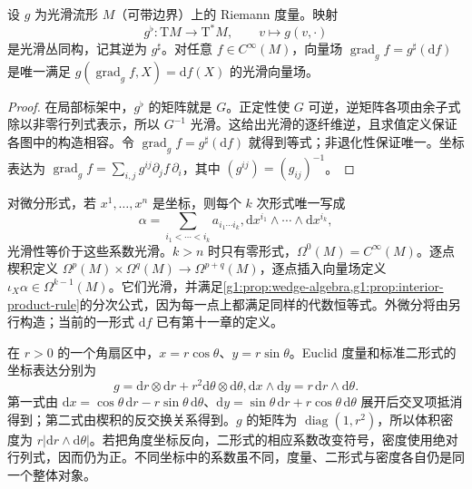 \begin{proposition}
	\label{g1:prop:metric-duality-smooth}
	设 \(g\) 为光滑流形 \(M\)（可带边界）上的 Riemann 度量。映射
	\[
		g^\flat:\mathrm{T}M\longrightarrow \mathrm{T}^*M,\qquad
		v\longmapsto g(v,\cdot)
	\]
	是光滑丛同构，记其逆为 \(g^\sharp\)。对任意 \(f\in C^\infty(M)\)，向量场 \(\operatorname{grad}_g f=g^\sharp(\mathrm{d}f)\) 是唯一满足 \(g(\operatorname{grad}_g f,X)=\mathrm{d}f(X)\) 的光滑向量场。
\end{proposition}

\begin{proof}
	在局部标架中，\(g^\flat\) 的矩阵就是 \(G\)。正定性使 \(G\) 可逆，逆矩阵各项由余子式除以非零行列式表示，所以 \(G^{-1}\) 光滑。这给出光滑的逐纤维逆，且求值定义保证各图中的构造相容。令 \(\operatorname{grad}_g f=g^\sharp(\mathrm{d}f)\) 就得到等式；非退化性保证唯一。坐标表达为 \(\operatorname{grad}_g f=\sum_{i,j}g^{ij}\partial_jf\,\partial_i\)，其中 \((g^{ij})=(g_{ij})^{-1}\)。
\end{proof}

对微分形式，若 \(x^1,\ldots,x^n\) 是坐标，则每个 \(k\) 次形式唯一写成
\[
	\alpha=\sum_{i_1<\cdots<i_k}a_{i_1\cdots i_k},
	\mathrm{d}x^{i_1}\wedge\cdots\wedge\mathrm{d}x^{i_k},
\]
光滑性等价于这些系数光滑。\(k>n\) 时只有零形式，\(\Omega^0(M)=C^\infty(M)\)。逐点楔积定义 \(\Omega^p(M)\times\Omega^q(M)\to\Omega^{p+q}(M)\)，逐点插入向量场定义 \(\iota_X\alpha\in\Omega^{k-1}(M)\)。它们光滑，并满足\cref{g1:prop:wedge-algebra,g1:prop:interior-product-rule}的分次公式，因为每一点上都满足同样的代数恒等式。外微分将由另行构造；当前的一形式 \(\mathrm{d}f\) 已有第十一章的定义。

\begin{example}
	\label{g1:exm:polar-tensors-density}
	在 \(r>0\) 的一个角扇区中，\(x=r\cos\theta\)、\(y=r\sin\theta\)。Euclid 度量和标准二形式的坐标表达分别为
	\[
		g=\mathrm{d}r\otimes\mathrm{d}r+r^2\mathrm{d}\theta\otimes\mathrm{d}\theta,
		\mathrm{d}x\wedge\mathrm{d}y=r\,\mathrm{d}r\wedge\mathrm{d}\theta.
	\]
	第一式由 \(\mathrm{d}x=\cos\theta\,\mathrm{d}r-r\sin\theta\,\mathrm{d}\theta\)、\(\mathrm{d}y=\sin\theta\,\mathrm{d}r+r\cos\theta\,\mathrm{d}\theta\) 展开后交叉项抵消得到；第二式由楔积的反交换关系得到。\(g\) 的矩阵为 \(\operatorname{diag}(1,r^2)\)，所以体积密度为 \(r|\mathrm{d}r\wedge\mathrm{d}\theta|\)。若把角度坐标反向，二形式的相应系数改变符号，密度使用绝对行列式，因而仍为正。不同坐标中的系数虽不同，度量、二形式与密度各自仍是同一个整体对象。
\end{example}

